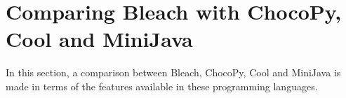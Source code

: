 \begin{comment}
  let queue = Queue();
  queue.push(source);

  while(!queue.empty()){
    let currNode = queue.pop();

    for(let i = 0; i < adjacencyList.getAt(currNode).size(); i = i + 1){
      let neighbor = adjacencyList.getAt(currNode).getAt(i);

      if(!visited.getAt(neighbor)){
        visited.setAt(neighbor, true);
        distance.setAt(neighbor, 1 + distance.getAt(currNode));
        queue.push(neighbor);
      }
    }
  }

  return;
}
        \end{lstlisting}
    \item Dijkstra's Shortest Path Algorithm
        \begin{lstlisting}
function dijkstraAlgorithm(source, adjacencyList, distance){
  let minHeap = MinBinaryHeap(); // Modified to receive lists of 2 elements.
  distance.setAt(source, 0);

  minHeap.push([0, source]);

  while(!minHeap.empty()){
    let currNodeInfo = minHeap.pop();
    let minPath = currNodeInfo.getAt(0);
    let currNode = currNodeInfo.getAt(1);

    for(let i = 0; i < adjacencyList.getAt(currNode).size(); i = i + 1){
      let neighbour = adjacencyList.getAt(currNode).getAt(i).getAt(0);
      let edge = adjacencyList.getAt(currNode).getAt(i).getAt(1);
      if(distance.getAt(currNode) + edge < distance.getAt(neighbour)){
        distance.setAt(neighbour, distance.getAt(currNode) + edge);
        minHeap.push([distance.getAt(neighbour), neighbour]);
      }
    }
  }

  return;
}
        \end{lstlisting}
\end{itemize}

\newpage

\end{comment}

\section{Comparing Bleach with ChocoPy, Cool and MiniJava}
In this section, a comparison between Bleach, ChocoPy, Cool and MiniJava is made in terms of the features available in these programming languages.

